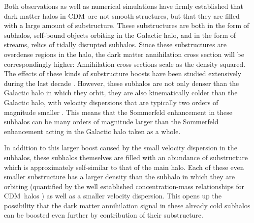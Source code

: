 \documentclass[aps,prd,twocolumn,amsmath,amssymb,floatfix,nofootinbib,10pt]{revtex4}
\newcommand{\CDM}{CDM}
\begin{document}
Both observations
\cite{1994Natur.370..194I,1999Natur.402...53H,2005ApJ...626L..85W,2007ApJ...654..897B,koposov}
as well as numerical simulations
\cite{1998MNRAS.300..146G,johnston98a,1999ApJ...524L..19M,1999ApJ...522...82K,1999MNRAS.307..495H,2003MNRAS.339..834H,2008Natur.454..735D,2008MNRAS.391.1685S}
have firmly established that dark matter halos in \CDM\ are not smooth
structures, but that they are filled with a large amount of
substructure. These substructures are both in the form of subhalos,
self-bound objects orbiting in the Galactic halo, and in the form of
streams, relics of tidally disrupted subhalos. Since these
substructures are overdense regions in the halo, the dark matter
annihilation cross section will be correspondingly higher:
Annihilation cross sections scale as the density squared. The effects
of these kinds of substructure boosts have been studied extensively
during the last decade
\cite{2004PhRvD..70b3512B,2004PhRvD..69d3501K,2007ApJ...657..262D,2007PhRvD..75h3526S,2008A&A...479..427L,2008MNRAS.384.1627P,2008ApJ...678..614S,2008ApJ...686..262K,2008Natur.456...73S,2008arXiv0809.2781G}. However,
these subhalos are not only denser than the Galactic halo in which
they orbit, they are also kinematically colder than the Galactic halo,
with velocity dispersions that are typically two orders of magnitude
smaller \cite{1998ARA&A..36..435M,2007ApJ...670..313S}. This means
that the Sommerfeld enhancement in these subhalos can be many orders
of magnitude larger than the Sommerfeld enhancement acting in the
Galactic halo taken as a whole.

In addition to this larger boost caused by the small velocity
dispersion in the subhalos, these subhalos themselves are filled with
an abundance of substructure which is approximately self-similar to
that of the main halo. Each of these even smaller substructure has a
larger density than the subhalo in which they are orbiting (quantified
by the well established concentration-mass relationships for \CDM\
halos \cite{2001MNRAS.321..559B,2001ApJ...554..114E}) as well as a
smaller velocity dispersion. This opens up the possibility that the
dark matter annihilation signal in these already cold subhalos can be
boosted even further by contribution of their substructure.
\end{document}
